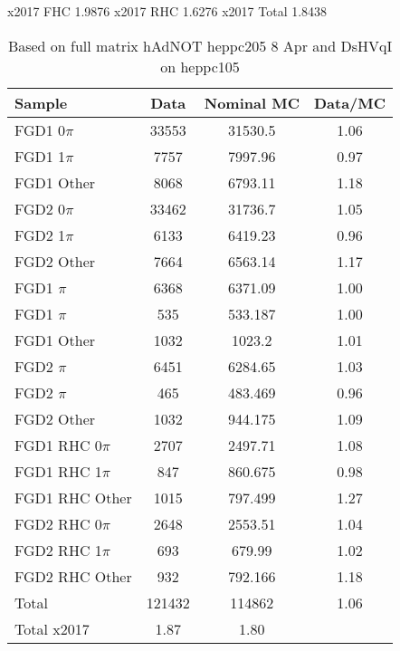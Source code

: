 x2017 FHC 1.9876
x2017 RHC 1.6276
x2017 Total 1.8438

\begin{table}[h]
	\centering
	\begin{tabular}{ l c c c }
		\hline
        \hline
		Sample & Data & Nominal MC & Data/MC \\
		\hline
		FGD1 0$\pi$       & 33553 & 31530.5  & 1.06 \\
		FGD1 1$\pi$       & 7757  & 7997.96  & 0.97 \\
		FGD1 Other        & 8068  & 6793.11  & 1.18 \\
		\hline
		FGD2 0$\pi$       & 33462 & 31736.7 & 1.05\\
		FGD2 1$\pi$       & 6133  & 6419.23 & 0.96 \\
		FGD2 Other        & 7664  & 6563.14 & 1.17 \\
		\hline
		FGD1 \numubar 0$\pi$       & 6368 & 6371.09  & 1.00 \\
		FGD1 \numubar 1$\pi$       & 535  & 533.187  & 1.00 \\
		FGD1 \numubar Other        & 1032 & 1023.2  & 1.01 \\
		\hline
		FGD2 \numubar 0$\pi$       & 6451 & 6284.65  & 1.03  \\
		FGD2 \numubar 1$\pi$       & 465  & 483.469  & 0.96 \\
		FGD2 \numubar Other        & 1032 & 944.175 & 1.09 \\
		\hline
		FGD1 \numu RHC 0$\pi$       & 2707 & 2497.71 & 1.08 \\
		FGD1 \numu RHC 1$\pi$       & 847  & 860.675 & 0.98 \\
		FGD1 \numu RHC Other        & 1015 & 797.499 & 1.27 \\
		\hline
		FGD2 \numu RHC 0$\pi$       & 2648 & 2553.51 & 1.04 \\
		FGD2 \numu RHC 1$\pi$       & 693  & 679.99  & 1.02 \\
		FGD2 \numu RHC Other        & 932  & 792.166 & 1.18 \\
                \hline
		Total & 121432 & 114862 & 1.06 \\
		Total x2017 & 1.87 & 1.80 & \\
		\hline
		\hline
	\end{tabular}
        \caption{Based on full matrix hAdNOT heppc205 8 Apr and DsHVqI on heppc105}
	\label{tab:detailed_eventrate_2018}
\end{table}

